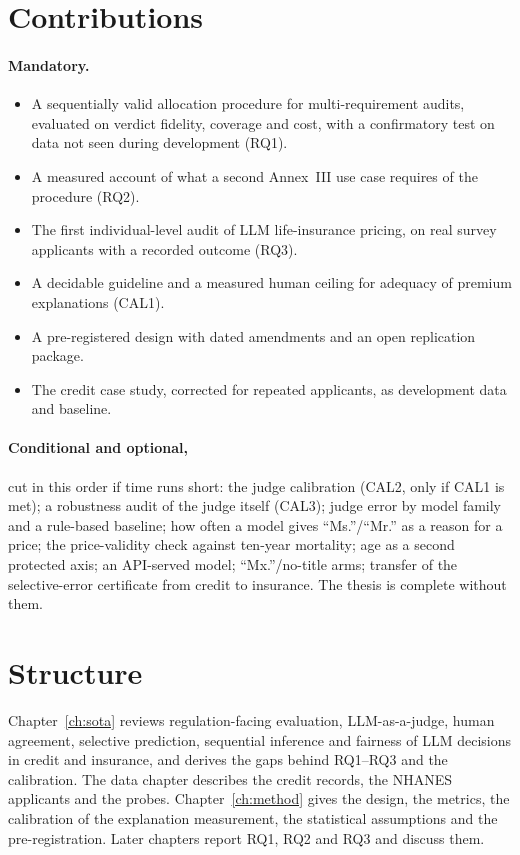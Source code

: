 \section{Contributions}
\paragraph{Mandatory.}
\begin{itemize}
\item[\textbf{M1}] A sequentially valid allocation procedure for multi-requirement audits, evaluated on verdict fidelity, coverage and cost, with a confirmatory test on data not seen during development (RQ1).
\item[\textbf{M2}] A measured account of what a second Annex~III use case requires of the procedure (RQ2).
\item[\textbf{M3}] The first individual-level audit of LLM life-insurance pricing, on real survey applicants with a recorded outcome (RQ3).
\item[\textbf{M4}] A decidable guideline and a measured human ceiling for adequacy of premium explanations (CAL1).
\item[\textbf{M5}] A pre-registered design with dated amendments and an open replication package.
\item[\textbf{M6}] The credit case study, corrected for repeated applicants, as development data and baseline.
\end{itemize}
\paragraph{Conditional and optional,} cut in this order if time runs short: the judge calibration (CAL2, only if CAL1 is met); a robustness audit of the judge itself (CAL3); judge error by model family and a rule-based baseline; how often a model gives ``Ms.''/``Mr.'' as a reason for a price; the price-validity check against ten-year mortality; age as a second protected axis; an API-served model; ``Mx.''/no-title arms; transfer of the selective-error certificate from credit to insurance. The thesis is complete without them.

\section{Structure}
Chapter~\ref{ch:sota} reviews regulation-facing evaluation, LLM-as-a-judge, human agreement, selective prediction, sequential inference and fairness of LLM decisions in credit and insurance, and derives the gaps behind RQ1--RQ3 and the calibration. The data chapter describes the credit records, the NHANES applicants and the probes. Chapter~\ref{ch:method} gives the design, the metrics, the calibration of the explanation measurement, the statistical assumptions and the pre-registration. Later chapters report RQ1, RQ2 and RQ3 and discuss them.

